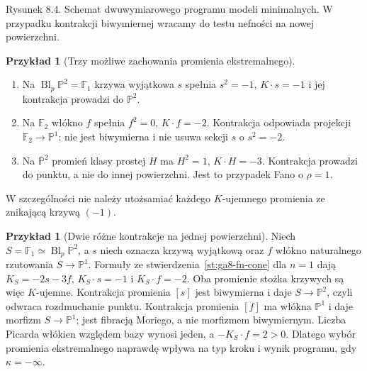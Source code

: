 \documentclass[11pt,a4paper,openany]{report}
\numberwithin{equation}{section}
\theoremstyle{plain}
\theoremstyle{definition}
\newtheorem{przyklad}[twierdzenie]{Przykład}
\theoremstyle{remark}
\newcommand{\PP}{\mathbb P}
\begin{document}
\begin{center}

{\small Rysunek 8.4. Schemat dwuwymiarowego programu modeli
minimalnych. W przypadku kontrakcji biwymiernej
wracamy do testu nefności na nowej powierzchni.}\par
\end{center}

\begin{przyklad}[Trzy możliwe zachowania promienia ekstremalnego]
\label{prz:ga8-extremal-examples}
\begin{enumerate}[label=(\roman*)]
\item Na $\operatorname{Bl}_p\PP^2=\mathbb F_1$
krzywa wyjątkowa $s$ spełnia $s^2=-1$,
$K\cdot s=-1$ i jej kontrakcja prowadzi do $\PP^2$.
\item Na $\mathbb F_2$ włókno $f$ spełnia
$f^2=0$, $K\cdot f=-2$. Kontrakcja odpowiada
projekcji $\mathbb F_2\to\PP^1$; nie jest
biwymierna i nie usuwa sekcji $s$ o $s^2=-2$.
\item Na $\PP^2$ promień klasy prostej $H$
ma $H^2=1$, $K\cdot H=-3$.
Kontrakcja prowadzi do punktu, a nie do innej
powierzchni. Jest to przypadek Fano o $\rho=1$.
\end{enumerate}
W szczególności nie należy utożsamiać każdego
$K$-ujemnego promienia ze znikającą krzywą $(-1)$.
\end{przyklad}

\begin{przyklad}[Dwie różne kontrakcje na jednej powierzchni]
\label{prz:ga8-f1-two-rays}
Niech $S=\mathbb F_1\simeq\operatorname{Bl}_p\PP^2$, a $s$
niech oznacza krzywą wyjątkową oraz $f$ włókno
naturalnego rzutowania $S\to\PP^1$. Formuły
ze stwierdzenia~\ref{st:ga8-fn-cone} dla $n=1$ dają
$K_S=-2s-3f$, $K_S\cdot s=-1$ i $K_S\cdot f=-2$.
Oba promienie stożka krzywych są więc $K$-ujemne.
Kontrakcja promienia $[s]$ jest biwymierna i daje
$S\to\PP^2$, czyli odwraca rozdmuchanie punktu.
Kontrakcja promienia $[f]$ ma włókna $\PP^1$
i daje morfizm $S\to\PP^1$; jest fibracją Moriego,
a nie morfizmem biwymiernym. Liczba Picarda włókien
względem bazy wynosi jeden, a $-K_S\cdot f=2>0$.
Dlatego wybór promienia ekstremalnego naprawdę wpływa
na typ kroku i wynik programu, gdy $\kappa=-\infty$.
\end{przyklad}
\end{document}
